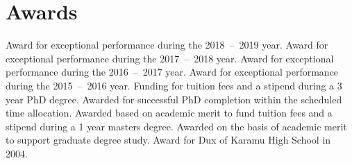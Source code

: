 \documentclass[print]{cv-style}
\begin{document}

\section{Awards}
\begin{entrylist}
{Award for exceptional performance during the 2018~--~2019 year.}
{Award for exceptional performance during the 2017~--~2018 year.}
{Award for exceptional performance during the 2016~--~2017 year.}
{Award for exceptional performance during the 2015~--~2016 year.}
{Funding for tuition fees and a stipend during a 3 year PhD degree.}
{Awarded for successful PhD completion within the scheduled time allocation.}
{Awarded based on academic merit to fund tuition fees and a stipend during a 1 year masters degree.}
{Awarded on the basis of academic merit to support graduate degree study.}
\vspace{-3mm}
\vspace{-3mm}
{Award for Dux of Karamu High School in 2004.}
\end{entrylist}


\pagebreak
\end{document}
